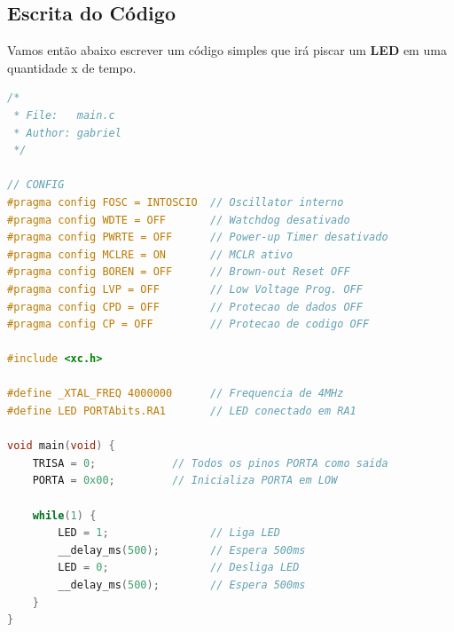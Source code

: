 \documentclass[12pt,a4paper]{book}
\begin{document}
\subsection{Escrita do Código}
Vamos então abaixo escrever um código simples que irá piscar um \textbf{LED} em uma quantidade x de tempo.
\begin{lstlisting}[language=C, caption=Programa para piscar LED no PIC16F628A, label=code:led_blink]
/*
 * File:   main.c
 * Author: gabriel
 */

// CONFIG
#pragma config FOSC = INTOSCIO  // Oscillator interno
#pragma config WDTE = OFF       // Watchdog desativado
#pragma config PWRTE = OFF      // Power-up Timer desativado
#pragma config MCLRE = ON       // MCLR ativo
#pragma config BOREN = OFF      // Brown-out Reset OFF
#pragma config LVP = OFF        // Low Voltage Prog. OFF
#pragma config CPD = OFF        // Protecao de dados OFF
#pragma config CP = OFF         // Protecao de codigo OFF

#include <xc.h>

#define _XTAL_FREQ 4000000      // Frequencia de 4MHz
#define LED PORTAbits.RA1       // LED conectado em RA1

void main(void) {
    TRISA = 0;            // Todos os pinos PORTA como saida
    PORTA = 0x00;         // Inicializa PORTA em LOW

    while(1) {
        LED = 1;                // Liga LED
        __delay_ms(500);        // Espera 500ms
        LED = 0;                // Desliga LED
        __delay_ms(500);        // Espera 500ms
    }
}
\end{lstlisting}
\end{document}
